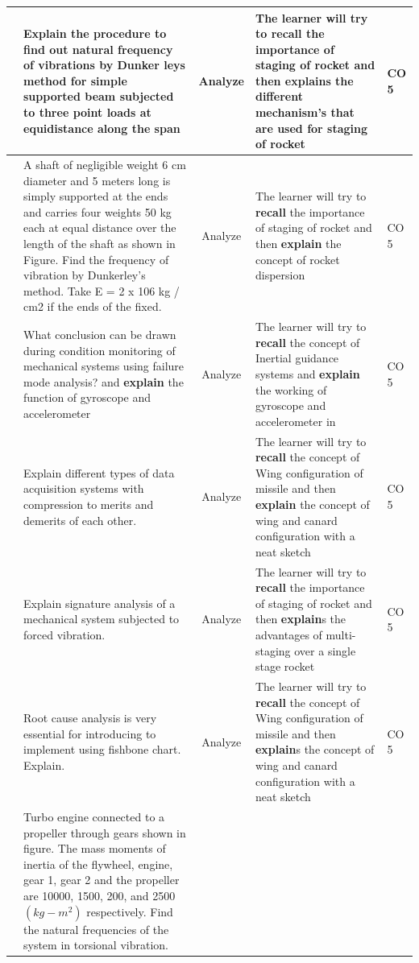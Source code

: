 \documentclass[11pt,paper=a4,answers]{exam}
\begin{document}
\begin{flushleft}
\begin{longtable}{|>{\centering\arraybackslash}p{0.8cm}  | >{\raggedright\arraybackslash}p{6.5cm}  | c | >{\raggedright\arraybackslash}p{5cm} |>{\centering\arraybackslash}p{1cm}|}
	\hline
	2&	Explain the procedure to find out natural frequency of vibrations by Dunker leys method for simple supported beam subjected to three point loads at equidistance along the span&	Analyze&	The learner will try to \textbf{recall} the importance of staging of rocket and then \textbf{explain}s the different mechanism’s that are used for staging of rocket&	CO 5\\
	\hline
	3&	A shaft of negligible weight 6 cm diameter and 5 meters long is simply supported at the ends and carries four weights 50 kg each at equal distance over the length of the shaft as shown in Figure. Find the frequency of vibration by Dunkerley's method.
Take E = 2 x 106 kg / cm2 if the ends of the fixed.
&	Analyze&	The learner will try to \textbf{recall} the importance of staging of rocket and then \textbf{explain} the concept of rocket dispersion &	CO 5\\
	\hline
	4&	What conclusion can be drawn during condition monitoring of mechanical systems using failure mode analysis? and \textbf{explain} the function of gyroscope and accelerometer&	Analyze&		The learner will try to \textbf{recall} the concept of Inertial guidance systems  and \textbf{explain} the working of gyroscope and accelerometer in&	CO 5\\
	\hline
	5&	Explain different types of data acquisition systems with compression to merits and demerits of each other.&	Analyze&	The learner will try to \textbf{recall} the concept of Wing configuration of missile and then \textbf{explain} the concept of wing and canard configuration with a neat sketch&	CO 5\\
	\hline
	6&	Explain signature analysis of a mechanical system subjected to forced vibration.&	Analyze&	The learner will try to \textbf{recall} the importance of staging of rocket and then \textbf{explain}s the advantages of multi-staging over a single stage rocket&	CO 5\\
	\hline
	7&	Root cause analysis is very essential for introducing to implement using fishbone chart. Explain.&	Analyze&	The learner will try to \textbf{recall} the concept of Wing configuration of missile and then \textbf{explain}s the concept of wing and canard configuration with a neat sketch&	CO 5\\
	\hline
8&	Turbo engine connected to a propeller through gears shown in figure. The mass moments of inertia of the flywheel, engine, gear 1, gear 2 and the propeller are 10000, 1500, 200, and 2500 $ (kg-m^2) $ respectively. Find the natural frequencies of the system in torsional vibration. 


\end{longtable}
\end{flushleft}
\end{document}
